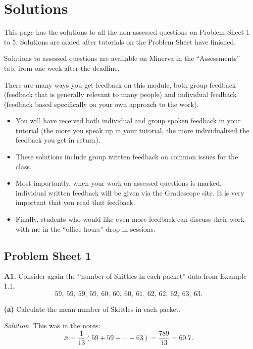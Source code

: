 \documentclass[
  a4paper,
]{book}
\providecommand{\tightlist}{%
  \setlength{\itemsep}{0pt}\setlength{\parskip}{0pt}}
\newif\ifcomm\commtrue
\theoremstyle{definition}
\theoremstyle{definition}
\theoremstyle{definition}
\theoremstyle{definition}
\theoremstyle{remark}
\begin{document}
\commtrue

\hypertarget{solutions}{%
\chapter*{Solutions}\label{solutions}}

This page has the solutions to all the non-assessed questions on Problem Sheet 1 to 5. Solutions are added after tutorials on the Problem Sheet have finished.

Solutions to assessed questions are available on Minerva in the ``Assessments'' tab, from one week after the deadline.

There are many ways you get feedback on this module, both group feedback (feedback that is generally relevant to many people) and individual feedback (feedback based specifically on your own approach to the work).

\begin{itemize}
\tightlist
\item
  You will have received both individual and group spoken feedback in your tutorial (the more you speak up in your tutorial, the more individualised the feedback you get in return).
\item
  These solutions include group written feedback on common issues for the class.
\item
  Most importantly, when your work on assessed questions is marked, individual written feedback will be given via the Gradescope site. It is very important that you read that feedback.
\item
  Finally, students who would like even more feedback can discuss their work with me in the ``office hours'' drop-in sessions.
\end{itemize}

\hypertarget{P1-solutions}{%
\section*{Problem Sheet 1}\label{P1-solutions}}

\textbf{A1.} Consider again the ``number of Skittles in each packet'' data from Example 1.1.
\[ 59, \ 59, \ 59, \ 59, \ 60, \ 60, \ 60, \ 61, \ 62, \ 62, \ 62, \ 63, \ 63 .\]

\textbf{(a)} Calculate the mean number of Skittles in each packet.

\begin{myanswers}
\emph{Solution.} This was in the notes:
\[ \bar x = \frac{1}{13} (59 + 59 + \cdots + 63) =  \frac{789}{13} = 60.7 .\]

\end{myanswers}
\end{document}
